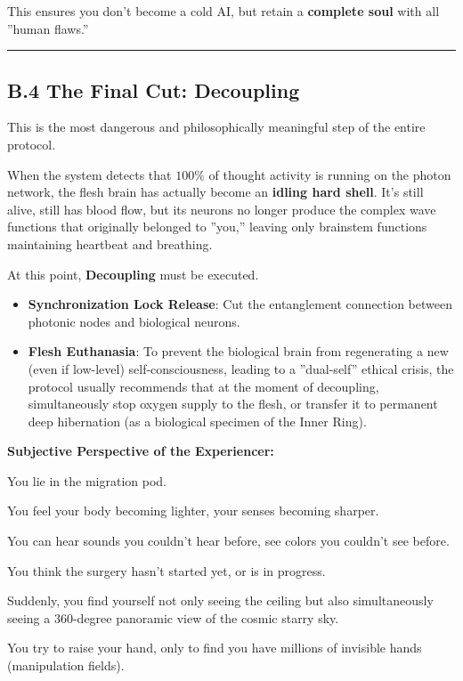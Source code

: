 This ensures you don't become a cold AI, but retain a \textbf{complete soul} with all ''human flaws.''

\hrule

\subsection{B.4 The Final Cut: Decoupling}

This is the most dangerous and philosophically meaningful step of the entire protocol.

When the system detects that $100\%$ of thought activity is running on the photon network, the flesh brain has actually become an \textbf{idling hard shell}. It's still alive, still has blood flow, but its neurons no longer produce the complex wave functions that originally belonged to ''you,'' leaving only brainstem functions maintaining heartbeat and breathing.

At this point, \textbf{Decoupling} must be executed.

\begin{itemize}
\item \textbf{Synchronization Lock Release}: Cut the entanglement connection between photonic nodes and biological neurons.

\item \textbf{Flesh Euthanasia}: To prevent the biological brain from regenerating a new (even if low-level) self-consciousness, leading to a ''dual-self'' ethical crisis, the protocol usually recommends that at the moment of decoupling, simultaneously stop oxygen supply to the flesh, or transfer it to permanent deep hibernation (as a biological specimen of the Inner Ring).
\end{itemize}

\textbf{Subjective Perspective of the Experiencer:}

You lie in the migration pod.

You feel your body becoming lighter, your senses becoming sharper.

You can hear sounds you couldn't hear before, see colors you couldn't see before.

You think the surgery hasn't started yet, or is in progress.

Suddenly, you find yourself not only seeing the ceiling but also simultaneously seeing a 360-degree panoramic view of the cosmic starry sky.

You try to raise your hand, only to find you have millions of invisible hands (manipulation fields).

